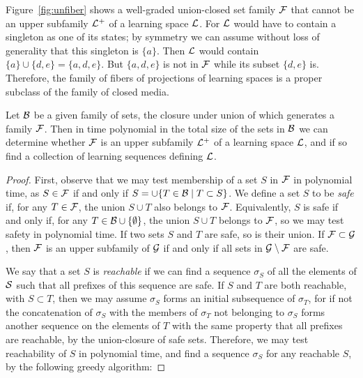 \documentclass[11pt]{llncs}
\begin{document}
{Figure~\ref{fig:unfiber} shows a well-graded union-closed set family $\cal F$ that cannot be an upper subfamily ${\cal L}^+$ of a learning space ${\cal L}$. For $\cal L$ would have to contain a singleton as one of its states; by symmetry we can assume without loss of generality that this singleton is $\{a\}$. Then $\cal L$ would contain $\{a\}\cup\{d,e\}=\{a,d,e\}$. But $\{a,d,e\}$ is not in $\cal F$ while its subset $\{d,e\}$ is. Therefore, the family of fibers of projections of learning spaces is a proper subclass of the family of closed media.

\begin{theorem}
Let $\cal B$ be a given family of sets, the closure under union of which generates a family $\cal F$.
Then in time polynomial in the total size of the sets in $\cal B$ we can determine whether $\cal F$ is an upper subfamily ${\cal L}^+$ of a learning space ${\cal L}$, and if so find a collection of learning sequences defining $\cal L$.
\end{theorem}

\begin{proof}
First, observe that we may test membership of a set $S$ in $\cal F$ in polynomial time, as $S\in\cal F$ if and only if $S=\cup\{T\in{\cal B}\mid T\subset S\}$. We define a set $S$ to be \emph{safe}
if, for any $T\in\cal F$, the union $S\cup T$ also belongs to $\cal F$. Equivalently, $S$ is safe if and only if, for any $T\in\cal B\cup\{\emptyset\}$, the union $S\cup T$ belongs to $\cal F$, so we may test safety in polynomial time.
If two sets $S$ and $T$ are safe, so is their union. If ${\cal F}\subset{\cal G}$, then ${\cal F}$ is an upper subfamily of $\cal G$ if and only if all sets in ${\cal G}\setminus{\cal F}$ are safe.
 
We say that a set $S$ is \emph{reachable} if we can find a sequence $\sigma_S$ of all the elements of $\cal S$ such that all prefixes of this sequence are safe. If $S$ and $T$ are both reachable, with $S\subset T$, then we may assume $\sigma_S$ forms an initial subsequence of $\sigma_T$, for if not the concatenation of $\sigma_S$ with the members of $\sigma_T$ not belonging to $\sigma_S$ forms another sequence on the elements of $T$ with the same property that all prefixes are reachable, by the union-closure of safe sets. Therefore, we may test reachability of $S$ in polynomial time, and find a sequence $\sigma_S$ for any reachable $S$, by the following greedy algorithm:


\end{proof}}
\end{document}
